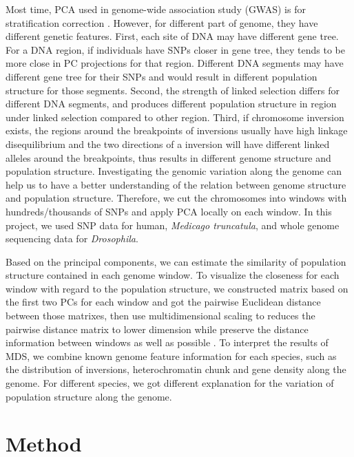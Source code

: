 \documentclass[11pt, oneside]{article}   	%
\begin{document}
\noindent  Most time, PCA used in genome-wide association study (GWAS) is for stratification correction \citep{price2006principal}. However, for different part of genome, they have different genetic features. First, each site of DNA may have different gene tree. For a DNA region, if individuals have SNPs closer in gene tree, they tends to be more close in PC projections for that region. Different DNA segments may have different gene tree for their SNPs and would result in different population structure for those segments. Second, the strength of linked selection differs for different DNA segments, and produces different population structure in region under linked selection compared to other region. Third, if chromosome inversion exists, the regions around the breakpoints of inversions usually have high linkage disequilibrium and the two directions of a inversion will have different linked alleles around the breakpoints, thus results in different genome structure and population structure. Investigating the genomic variation along the genome can help us to have a better understanding of the relation between genome structure and population structure. Therefore, we cut the chromosomes into windows with hundreds/thousands of SNPs and apply PCA locally on each window. In this project, we used SNP data for human, \textit{Medicago truncatula}, and whole genome sequencing data for \textit{Drosophila}.

\noindent Based on the principal components, we can estimate the similarity of population structure contained in each genome window. To visualize the closeness for each window with regard to the population structure, we constructed matrix based on the first two PCs for each window and got the pairwise Euclidean distance between those matrixes, then use multidimensional scaling to reduces the pairwise distance matrix to lower dimension while preserve the distance information between windows as well as possible \citep{borg2005modern}. To interpret the results of MDS, we combine known genome feature information for each species, such as the distribution of inversions, heterochromatin chunk and gene density along the genome. For different species, we got different explanation for the variation of population structure along the genome.

\section{Method}
\end{document}

